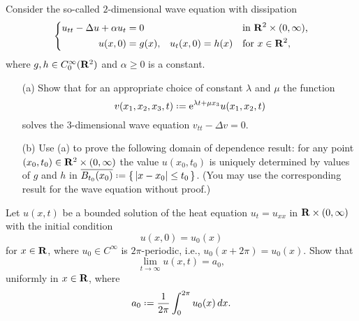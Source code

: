 \begin{problem}
  Consider the so-called \(2\)-dimensional wave equation with dissipation
  \[
    \left\{
      \begin{aligned}
        u_{tt}-\Delta u+\alpha u_t&=0&&&&\text{in \(\mathbf{R}^2\times(0,\infty)\),}\\
        u(x,0)&=g(x),&u_t(x,0)&=h(x)&&\text{for \(x\in\mathbf{R}^2\),}
      \end{aligned}
    \right.
  \]
  where \(g,h\in C_0^\infty(\mathbf{R}^2)\) and \(\alpha\geq 0\) is a constant.
  \begin{itemize}[noitemsep]
  \item[(a)] Show that for an appropriate choice of constant \(\lambda\)
    and \(\mu\) the function
    \[
      v(x_1,x_2,x_3,t)\defeq \rme^{\lambda t+\mu x_3}u(x_1,x_2,t)
    \]
    solves the \(3\)-dimensional wave equation \(v_{tt}-\Delta v=0\).
  \item[(b)] Use (a) to prove the following domain of dependence result:
    for any point \((x_0,t_0)\in\mathbf{R}^2\times(0,\infty)\) the value
    \(u(x_0,t_0)\) is uniquely determined by values of \(g\) and \(h\) in
    \(\overline{B_{t_0}(x_0)}\defeq\{\,|x-x_0|\leq t_0\,\}\). (You may use
    the corresponding result for the wave equation without proof.)
  \end{itemize}
\end{problem}
\begin{solution*}
\end{solution*}

\begin{problem}
  Let \(u(x,t)\) be a bounded solution of the heat equation \(u_t=u_{xx}\)
  in \(\mathbf{R}\times(0,\infty)\) with the initial condition
  \[
    u(x,0)=u_0(x)
  \]
  for \(x\in\mathbf{R}\), where \(u_0\in C^\infty\) is \(2\pi\)-periodic, i.e.,
  \(u_0(x+2\pi)=u_0(x)\). Show that
  \[
    \lim_{t\to\infty} u(x,t)=a_0,
  \]
  uniformly in \(x\in\mathbf{R}\), where
  \[
    a_0\defeq\frac{1}{2\pi}\int_0^{2\pi} u_0(x)\diff x.
  \]
\end{problem}
\begin{solution*}
\end{solution*}

